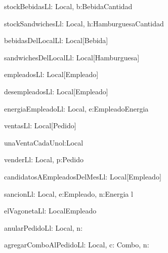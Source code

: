 
\begin{problema}{stockBebidasL}{l: Local, b:Bebida}{Cantidad}
\end{problema}

\begin{problema}{stockSandwichesL}{l: Local, h:Hamburguesa}{Cantidad}
\end{problema}

\begin{problema}{bebidasDelLocalL}{l: Local}{[Bebida]}
\end{problema}
	
\begin{problema}{sandwichesDelLocalL}{l: Local}{[Hamburguesa]}
\end{problema}

\begin{problema}{empleadosL}{l: Local}{[Empleado]}
\end{problema}

\begin{problema}{desempleadosL}{l: Local}{[Empleado]}
\end{problema}

\begin{problema}{energiaEmpleadoL}{l: Local, e:Empleado}{Energia}
\end{problema}

\begin{problema}{ventasL}{l: Local}{[Pedido]}
\end{problema}

\begin{problema}{unaVentaCadaUno}{l:Local}{\bool}
\end{problema}

\begin{problema}{venderL}{l: Local, p:Pedido}{}
\end{problema}

\begin{problema}{candidatosAEmpleadosDelMesL}{l: Local}{[Empleado]}
\end{problema}


\begin{problema}{sancionL}{l: Local, e:Empleado, n:Energia}{}
	\modifica l
\end{problema}



\begin{problema}{elVagonetaL}{l: Local}{Empleado}
\end{problema}

\begin{problema}{anularPedidoL}{l: Local, n: \ent}{}
\end{problema}

\begin{problema}{agregarComboAlPedidoL}{l: Local, c: Combo, n:\ent}{}
 \end{problema}